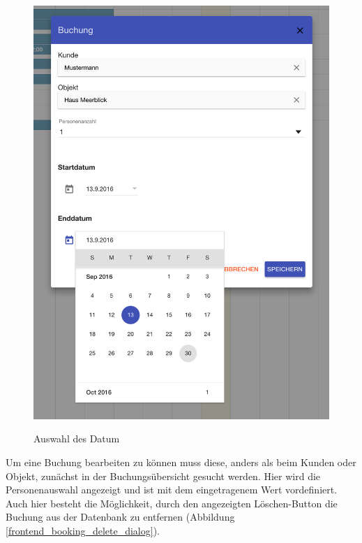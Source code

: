 \begin{figure}[H]
\begin{minipage}[t]{0.49\linewidth}
        \includegraphics[width=\linewidth]{images/frontend_booking_calender.png}
        \label{frontend_booking_calender}
        \caption{Auswahl des Datum}
    \end{minipage}
\end{figure}

Um eine Buchung bearbeiten zu können muss diese, anders als beim Kunden oder Objekt, zunächst in der Buchungsübersicht gesucht werden. Hier wird die Personenauswahl angezeigt und ist mit dem eingetragenem Wert vordefiniert. Auch hier besteht die Möglichkeit, durch den angezeigten Löschen-Button die Buchung aus der Datenbank zu entfernen (Abbildung \ref{frontend_booking_delete_dialog}).  

